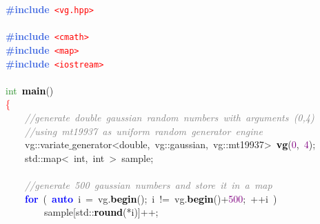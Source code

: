 \noindent
\mbox{}\textbf{\textcolor{RoyalBlue}{\#include}}\ \texttt{\textcolor{Red}{\textless{}vg.hpp\textgreater{}}} \\
\mbox{} \\
\mbox{}\textbf{\textcolor{RoyalBlue}{\#include}}\ \texttt{\textcolor{Red}{\textless{}cmath\textgreater{}}} \\
\mbox{}\textbf{\textcolor{RoyalBlue}{\#include}}\ \texttt{\textcolor{Red}{\textless{}map\textgreater{}}} \\
\mbox{}\textbf{\textcolor{RoyalBlue}{\#include}}\ \texttt{\textcolor{Red}{\textless{}iostream\textgreater{}}} \\
\mbox{} \\
\mbox{}\textcolor{ForestGreen}{int}\ \textbf{\textcolor{Black}{main}}\textcolor{BrickRed}{()} \\
\mbox{}\textcolor{Red}{\{} \\
\mbox{}\ \ \ \ \textit{\textcolor{Gray}{//generate\ double\ gaussian\ random\ numbers\ with\ arguments\ (0,4)}} \\
\mbox{}\ \ \ \ \textit{\textcolor{Gray}{//using\ mt19937\ as\ uniform\ random\ generator\ engine}} \\
\mbox{}\ \ \ \ vg\textcolor{BrickRed}{::}\textcolor{TealBlue}{variate$\_$generator\textless{}double,\ vg::gaussian,\ vg::mt19937\textgreater{}}\ \textbf{\textcolor{Black}{vg}}\textcolor{BrickRed}{(}\textcolor{Purple}{0}\textcolor{BrickRed}{,}\ \textcolor{Purple}{4}\textcolor{BrickRed}{);}\ \ \ \  \\
\mbox{}\ \ \ \ std\textcolor{BrickRed}{::}\textcolor{TealBlue}{map\textless{}\ int,\ int\ \textgreater{}}\ sample\textcolor{BrickRed}{;} \\
\mbox{} \\
\mbox{}\ \ \ \ \textit{\textcolor{Gray}{//generate\ 500\ gaussian\ numbers\ and\ store\ it\ in\ a\ map}} \\
\mbox{}\ \ \ \ \textbf{\textcolor{Blue}{for}}\ \textcolor{BrickRed}{(}\ \textbf{\textcolor{Blue}{auto}}\ i\ \textcolor{BrickRed}{=}\ vg\textcolor{BrickRed}{.}\textbf{\textcolor{Black}{begin}}\textcolor{BrickRed}{();}\ i\ \textcolor{BrickRed}{!=}\ vg\textcolor{BrickRed}{.}\textbf{\textcolor{Black}{begin}}\textcolor{BrickRed}{()+}\textcolor{Purple}{500}\textcolor{BrickRed}{;}\ \textcolor{BrickRed}{++}i\ \textcolor{BrickRed}{)} \\
\mbox{}\ \ \ \ \ \ \ \ sample\textcolor{BrickRed}{[}std\textcolor{BrickRed}{::}\textbf{\textcolor{Black}{round}}\textcolor{BrickRed}{(*}i\textcolor{BrickRed}{)]++;} \\
